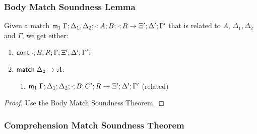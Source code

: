 \subsubsection{Body Match Soundness Lemma}

\begin{lemma}
   Given a match $\mathsf{m}_1 \; \Gamma; \Delta_1, \Delta_2; \cdot; A; B; \cdot; R \rightarrow \Xi'; \Delta'; \Gamma'$ that is related to $A$, $\Delta_1, \Delta_2$ and $\Gamma$, we get either:
   
   \begin{enumerate}
      \item $\mathsf{cont} \; \cdot; B; R; \Gamma; \Xi'; \Delta'; \Gamma'$;
      \item $\mathsf{match} \; \Delta_2 \rightarrow A$:
      \begin{enumerate}
         \item $\mathsf{m}_1 \; \Gamma; \Delta_1; \Delta_2; \cdot; B; C'; R \rightarrow \Xi'; \Delta'; \Gamma'$ (related)
      \end{enumerate}
   \end{enumerate}
   
\end{lemma}

\begin{proof}
   Use the Body Match Soundness Theorem.
\end{proof}

\subsubsection{Comprehension Match Soundness Theorem}

